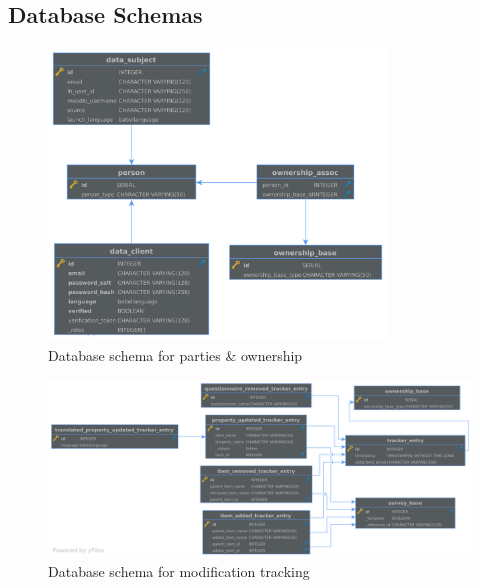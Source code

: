 \documentclass[a4paper,11pt]{article}
\begin{document}
            \subsection{Database Schemas}
                \begin{figure}[H]
                    \centering
                    \includegraphics[width=0.8\textwidth]{schema-parties}
                    \caption{Database schema for parties \& ownership}
                    \label{fig:schema-parties}
                \end{figure}

                \begin{figure}[H]
                    \centering
                    \includegraphics[width=\textwidth]{schema-tracking}
                    \caption{Database schema for modification tracking}
                    \label{fig:schema-tracking}
                \end{figure}
\end{document}

